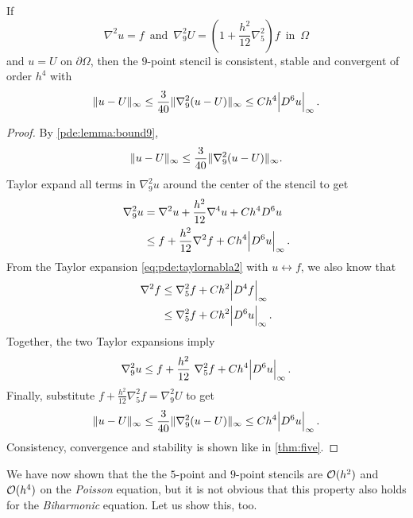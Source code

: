 \begin{theorem}\label{thm:nine}
If 
$$ \nabla^2 u = f \,\,\, \text{and} \,\,\, \nabla_9^2 U = \left( 1 + \frac{h^2}{12} \nabla_5^2 \right) f \,\,\, \text{in} \,\,\, \Omega $$
and $u = U$ on $\partial \Omega$, then the $9$-point stencil is consistent, stable and convergent of order $h^4$ with
$$
\lVert u - U \rVert_\infty \leq \frac{3}{40} \lVert \nabla_9^2(u-U) \rVert_\infty \leq C h^4 \abs{D^6 u}_\infty.
$$
\end{theorem}
\begin{proof}
By \cref{pde:lemma:bound9},
$$
\lVert u - U \rVert_\infty \leq \frac{3}{40} \lVert \nabla_9^2 (u  - U) \rVert_\infty.
$$
Taylor expand all terms in $\nabla_9^2 u$ around the center of the stencil to get
\begin{equation*}
\begin{split}
\nabla_9^2 u &= \nabla^2 u + \frac{h^2}{12} \nabla^4 u + C h^4 D^6 u \\
             &\leq f + \frac{h^2}{12} \nabla^2 f + Ch^4 \abs{D^6 u}_\infty.\\
\end{split}
\end{equation*}
From the Taylor expansion \ref{eq:pde:taylornabla2} with $u \leftrightarrow f$, we also know that
\begin{equation*}
\begin{split}
\nabla^2 f &\leq \nabla_5^2 f + Ch^2 \abs{D^4 f}_\infty \\
           &\leq \nabla_5^2 f + Ch^2 \abs{D^6 u}_\infty.\\
\end{split}
\end{equation*}
Together, the two Taylor expansions imply
\begin{equation}
	\nabla_9^2 u \leq f + \frac{h^2}{12} \nabla_5^2 f + Ch^4 \abs{D^6 u}_\infty.
\label{eq:pde:taylornabla22}
\end{equation}
Finally, substitute $f + \frac{h^2}{12} \nabla_5^2 f = \nabla_9^2 U$ to get
\begin{equation*}
  \lVert u-U \rVert_\infty \leq \frac{3}{40} \lVert \nabla_9^2 (u - U) \rVert_\infty \leq C h^4 \abs{D^6 u}_\infty.
\end{equation*}
Consistency, convergence and stability is shown like in \cref{thm:five}.
\end{proof}

We have now shown that the the $5$-point and $9$-point stencils are $\mathcal{O}(h^2)$ and $\mathcal{O}(h^4)$ on the \emph{Poisson} equation, but it is not obvious that this property also holds for the \emph{Biharmonic} equation.
Let us show this, too.

